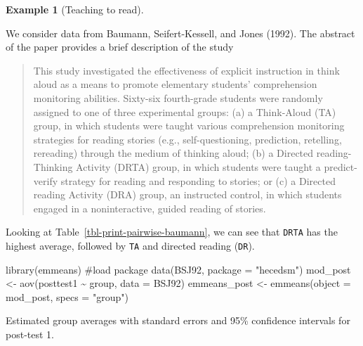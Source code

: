 \documentclass[
  11pt,
  letterpaper,
]{scrbook}
\newenvironment{Shaded}{\begin{snugshade}}{\end{snugshade}}
\newcommand{\AttributeTok}[1]{\textcolor[rgb]{0.40,0.45,0.13}{#1}}
\newcommand{\CommentTok}[1]{\textcolor[rgb]{0.37,0.37,0.37}{#1}}
\newcommand{\FunctionTok}[1]{\textcolor[rgb]{0.28,0.35,0.67}{#1}}
\newcommand{\NormalTok}[1]{\textcolor[rgb]{0.00,0.23,0.31}{#1}}
\newcommand{\OtherTok}[1]{\textcolor[rgb]{0.00,0.23,0.31}{#1}}
\newcommand{\SpecialCharTok}[1]{\textcolor[rgb]{0.37,0.37,0.37}{#1}}
\newcommand{\StringTok}[1]{\textcolor[rgb]{0.13,0.47,0.30}{#1}}
\theoremstyle{definition}
\newtheorem{example}{Example}[chapter]
\theoremstyle{remark}
\begin{document}
\begin{example}[Teaching to
read]\protect\hypertarget{exm-teachingtoread}{}\label{exm-teachingtoread}

We consider data from Baumann, Seifert-Kessell, and Jones (1992). The
abstract of the paper provides a brief description of the study

\begin{quote}
This study investigated the effectiveness of explicit instruction in
think aloud as a means to promote elementary students' comprehension
monitoring abilities. Sixty-six fourth-grade students were randomly
assigned to one of three experimental groups: (a) a Think-Aloud (TA)
group, in which students were taught various comprehension monitoring
strategies for reading stories (e.g., self-questioning, prediction,
retelling, rereading) through the medium of thinking aloud; (b) a
Directed reading-Thinking Activity (DRTA) group, in which students were
taught a predict-verify strategy for reading and responding to stories;
or (c) a Directed reading Activity (DRA) group, an instructed control,
in which students engaged in a noninteractive, guided reading of
stories.
\end{quote}

Looking at Table~\ref{tbl-print-pairwise-baumann}, we can see that
\texttt{DRTA} has the highest average, followed by \texttt{TA} and
directed reading (\texttt{DR}).

\begin{Shaded}
\begin{Highlighting}[]
\FunctionTok{library}\NormalTok{(emmeans) }\CommentTok{\#load package}
\FunctionTok{data}\NormalTok{(BSJ92, }\AttributeTok{package =} \StringTok{"hecedsm"}\NormalTok{)}
\NormalTok{mod\_post }\OtherTok{\textless{}{-}} \FunctionTok{aov}\NormalTok{(posttest1 }\SpecialCharTok{\textasciitilde{}}\NormalTok{ group, }\AttributeTok{data =}\NormalTok{ BSJ92)}
\NormalTok{emmeans\_post }\OtherTok{\textless{}{-}} \FunctionTok{emmeans}\NormalTok{(}\AttributeTok{object =}\NormalTok{ mod\_post, }
                        \AttributeTok{specs =} \StringTok{"group"}\NormalTok{)}
\end{Highlighting}
\end{Shaded}

\hypertarget{tbl-print-pairwise-baumann}{}
\begin{table}
\caption{\label{tbl-print-pairwise-baumann}Estimated group averages with standard errors and 95\% confidence
intervals for post-test 1. }\tabularnewline


\end{table}
\end{example}
\end{document}
